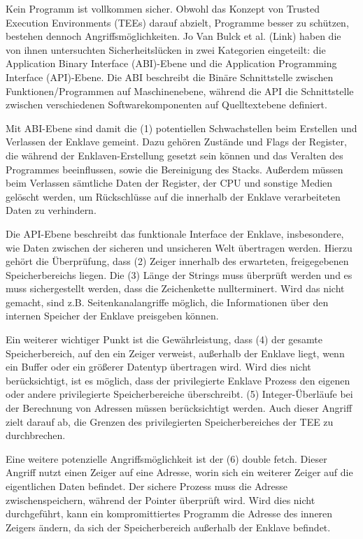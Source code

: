 Kein Programm ist vollkommen sicher. Obwohl das Konzept von Trusted Execution Environments (TEEs) darauf abzielt, Programme besser zu schützen, bestehen dennoch Angriffsmöglichkeiten. Jo Van Bulck et al. (Link) haben die von ihnen untersuchten Sicherheitslücken in zwei Kategorien eingeteilt: die Application Binary Interface (ABI)-Ebene und die Application Programming Interface (API)-Ebene. Die ABI beschreibt die Binäre Schnittstelle zwischen Funktionen/Programmen auf Maschinenebene, während die API die Schnittstelle zwischen verschiedenen Softwarekomponenten auf Quelltextebene definiert.

Mit ABI-Ebene sind damit die (1) potentiellen Schwachstellen beim Erstellen und Verlassen der Enklave gemeint. Dazu gehören Zustände und Flags der Register, die während der Enklaven-Erstellung gesetzt sein können und das Veralten des Programmes beeinflussen, sowie die Bereinigung des Stacks. Außerdem müssen beim Verlassen sämtliche Daten der Register, der CPU und sonstige Medien gelöscht werden, um Rückschlüsse auf die innerhalb der Enklave verarbeiteten Daten zu verhindern.

Die API-Ebene beschreibt das funktionale Interface der Enklave, insbesondere, wie Daten zwischen der sicheren und unsicheren Welt übertragen werden. Hierzu gehört die Überprüfung, dass (2) Zeiger innerhalb des erwarteten, freigegebenen Speicherbereichs liegen. Die (3) Länge der Strings muss überprüft werden und es muss sichergestellt werden, dass die Zeichenkette nullterminert. Wird das nicht gemacht, sind z.B. Seitenkanalangriffe möglich, die Informationen über den internen Speicher der Enklave preisgeben können. 

Ein weiterer wichtiger Punkt ist die Gewährleistung, dass (4) der gesamte Speicherbereich, auf den ein Zeiger verweist, außerhalb der Enklave liegt, wenn ein Buffer oder ein größerer Datentyp übertragen wird. Wird dies nicht berücksichtigt, ist es möglich, dass der privilegierte Enklave Prozess den eigenen oder andere privilegierte Speicherbereiche überschreibt. (5) Integer-Überläufe bei der Berechnung von Adressen müssen berücksichtigt werden. Auch dieser Angriff zielt darauf ab, die Grenzen des privilegierten Speicherbereiches der TEE zu durchbrechen. 

Eine weitere potenzielle Angriffsmöglichkeit ist der (6) double fetch. Dieser Angriff nutzt einen Zeiger auf eine Adresse, worin sich ein weiterer Zeiger auf die eigentlichen Daten befindet. Der sichere Prozess muss die Adresse zwischenspeichern, während der Pointer überprüft wird. Wird dies nicht durchgeführt, kann ein kompromittiertes Programm die Adresse des inneren Zeigers ändern, da sich der Speicherbereich außerhalb der Enklave befindet.